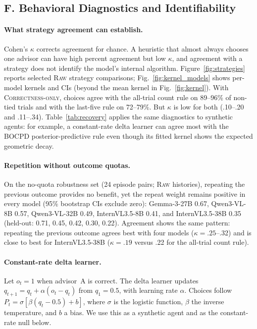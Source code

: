 \documentclass[letterpaper]{article} %
\newcommand{\Raw}{\textsc{Raw}}
\newcommand{\CorrectnessOnly}{\textsc{Correctness-only}}
\begin{document}
\subsection{F. Behavioral Diagnostics and Identifiability}
\paragraph{What strategy agreement can establish.} Cohen's $\kappa$ corrects agreement for chance. A heuristic that almost always chooses one advisor can have high percent agreement but low $\kappa$, and agreement with a strategy does not identify the model's internal algorithm. Figure~\ref{fig:strategies} reports selected \Raw{} strategy comparisons; Fig.~\ref{fig:kernel_models} shows per-model kernels and CIs (beyond the mean kernel in Fig.~\ref{fig:kernel}). With \CorrectnessOnly{}, choices agree with the all-trial count rule on 89--96\% of non-tied trials and with the last-five rule on 72--79\%. But $\kappa$ is low for both (.10--.20 and .11--.34). Table~\ref{tab:recovery} applies the same diagnostics to synthetic agents: for example, a constant-rate delta learner can agree most with the BOCPD posterior-predictive rule even though its fitted kernel shows the expected geometric decay.

\paragraph{Repetition without outcome quotas.} On the no-quota robustness set (24 episode pairs; \Raw{} histories), repeating the previous outcome provides no benefit, yet the repeat weight remains positive in every model (95\% bootstrap CIs exclude zero): Gemma-3-27B 0.67, Qwen3-VL-8B 0.57, Qwen3-VL-32B 0.49, InternVL3.5-8B 0.41, and InternVL3.5-38B 0.35 (held-out: 0.71, 0.45, 0.42, 0.30, 0.22). Agreement shows the same pattern: repeating the previous outcome agrees best with four models ($\kappa=.25$--.32) and is close to best for InternVL3.5-38B ($\kappa=.19$ versus .22 for the all-trial count rule).

\paragraph{Constant-rate delta learner.} Let $o_t=1$ when advisor~A is correct. The delta learner updates $q_{t+1}=q_t+\alpha(o_t-q_t)$ from $q_1=0.5$, with learning rate $\alpha$. Choices follow $P_t=\sigma[\beta(q_t-0.5)+b]$, where $\sigma$ is the logistic function, $\beta$ the inverse temperature, and $b$ a bias. We use this as a synthetic agent and as the constant-rate null below.
\end{document}
